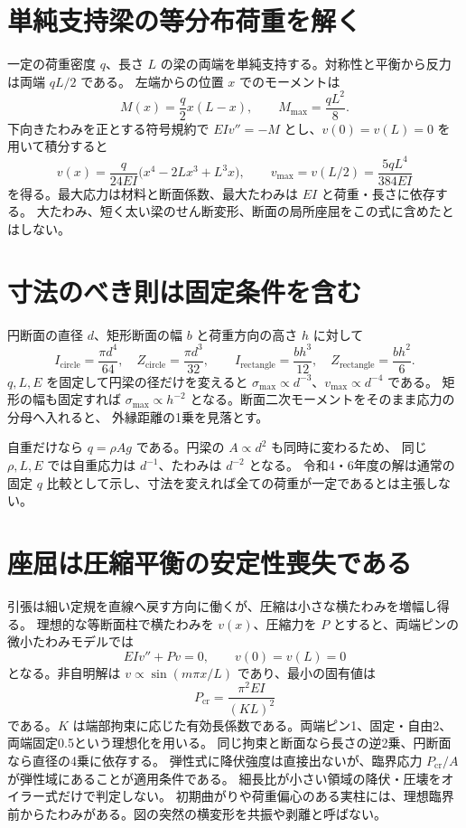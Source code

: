 \section{単純支持梁の等分布荷重を解く}
一定の荷重密度 \(q\)、長さ \(L\) の梁の両端を単純支持する。対称性と平衡から反力は両端 \(qL/2\) である。
左端からの位置 \(x\) でのモーメントは
\[
 M(x)=\frac q2 x(L-x),\qquad M_{\max}=\frac{qL^2}{8}.
\]
下向きたわみを正とする符号規約で \(EI v''=-M\) とし、\(v(0)=v(L)=0\) を用いて積分すると
\[
 v(x)=\frac{q}{24EI}\bigl(x^4-2Lx^3+L^3x\bigr),\qquad
 v_{\max}=v(L/2)=\frac{5qL^4}{384EI}
\]
を得る。最大応力は材料と断面係数、最大たわみは \(EI\) と荷重・長さに依存する。
大たわみ、短く太い梁のせん断変形、断面の局所座屈をこの式に含めたとはしない。

\section{寸法のべき則は固定条件を含む}
\label{theory:structural:scaling}
円断面の直径 \(d\)、矩形断面の幅 \(b\) と荷重方向の高さ \(h\) に対して
\[
 I_{\mathrm{circle}}=\frac{\pi d^4}{64},\quad
 Z_{\mathrm{circle}}=\frac{\pi d^3}{32},\qquad
 I_{\mathrm{rectangle}}=\frac{bh^3}{12},\quad
 Z_{\mathrm{rectangle}}=\frac{bh^2}{6}.
\]
\(q,L,E\) を固定して円梁の径だけを変えると \(\sigma_{\max}\propto d^{-3}\)、\(v_{\max}\propto d^{-4}\) である。
矩形の幅も固定すれば \(\sigma_{\max}\propto h^{-2}\) となる。断面二次モーメントをそのまま応力の分母へ入れると、
外縁距離の1乗を見落とす。
\begin{tcolorbox}[title=自重を固定荷重として扱わない]
自重だけなら \(q=\rho Ag\) である\cite{struct_mit_beam}。円梁の \(A\propto d^2\) も同時に変わるため、
同じ \(\rho,L,E\) では自重応力は \(d^{-1}\)、たわみは \(d^{-2}\) となる。
令和4・6年度の解は通常の固定 \(q\) 比較として示し、寸法を変えれば全ての荷重が一定であるとは主張しない。
\end{tcolorbox}

\section{座屈は圧縮平衡の安定性喪失である}
\label{theory:structural:buckling}
引張は細い定規を直線へ戻す方向に働くが、圧縮は小さな横たわみを増幅し得る。
理想的な等断面柱で横たわみを \(v(x)\)、圧縮力を \(P\) とすると、両端ピンの微小たわみモデルでは
\[
 EI v''+Pv=0,\qquad v(0)=v(L)=0
\]
となる。非自明解は \(v\propto\sin(m\pi x/L)\) であり、最小の固有値は
\[
 P_{\mathrm{cr}}=\frac{\pi^2EI}{(KL)^2}
\]
である。\(K\) は端部拘束に応じた有効長係数である。両端ピン1、固定・自由2、両端固定0.5という理想化を用いる。
同じ拘束と断面なら長さの逆2乗、円断面なら直径の4乗に依存する。
弾性式に降伏強度は直接出ないが、臨界応力 \(P_{\mathrm{cr}}/A\) が弾性域にあることが適用条件である。
細長比が小さい領域の降伏・圧壊をオイラー式だけで判定しない\cite{struct_mit_buckling}。
初期曲がりや荷重偏心のある実柱には、理想臨界前からたわみがある。図の突然の横変形を共振や剥離と呼ばない。


